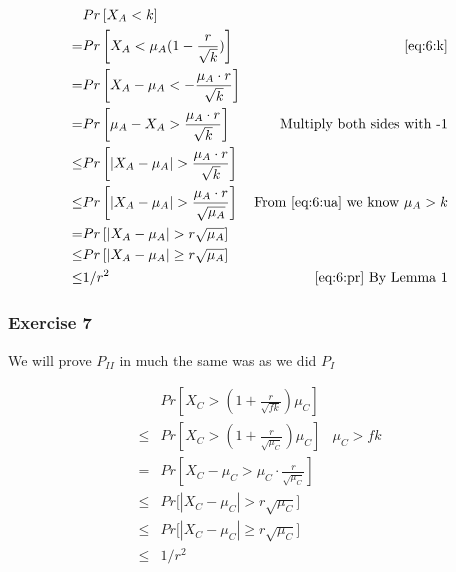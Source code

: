 \begin{align*}
	 & Pr\left[X_A < k\right] & \\
	=& Pr\left[X_A < \mu_A(1-\frac{r}{\sqrt{k}})\right] & \text{ \eqref{eq:6:k}} \\
	=& Pr\left[X_A - \mu_A < -\frac{\mu_A \cdot r}{\sqrt{k}} \right] & \\
	=& Pr\left[\mu_A - X_A > \frac{\mu_A \cdot r}{\sqrt{k}} \right] & \text{Multiply both sides with -1} \\
	\leq & Pr\left[|X_A - \mu_A| > \frac{\mu_A \cdot r}{\sqrt{k}} \right] 
		& \\
	\leq & Pr\left[|X_A - \mu_A| > \frac{\mu_A \cdot r}{\sqrt{\mu_A}} \right]
		& \text{From \eqref{eq:6:ua} we know $\mu_A > k$} \\
	=& Pr\left[|X_A - \mu_A| > r \sqrt{\mu_A} \right]
		&\\
	\leq & Pr\left[|X_A - \mu_A| \geq r \sqrt{\mu_A} \right]
		& \\
	\leq & 1/r^2 & \text{\eqref{eq:6:pr} By Lemma 1}
\end{align*}

\subsubsection{Exercise 7}
We will prove $P_{II}$ in much the same was as we did $P_{I}$

\begin{align*}
	& Pr\left[ X_C > (1+\frac{r}{\sqrt{fk}}) \mu_C \right] & \\
	\leq & Pr\left[ X_C > (1+\frac{r}{\sqrt{\mu_C}}) \mu_C \right]
		& \text{$\mu_C > fk$} \\
		=& Pr\left[ X_C - \mu_C > \mu_C \cdot \frac{r}{\sqrt{\mu_C}} \right]
		& \\
	\leq& Pr\Big[ | X_C - \mu_C | > r \sqrt{\mu_C} \Big]
		& \\
	\leq& Pr\Big[ | X_C - \mu_C | \geq r \sqrt{\mu_C} \Big]
		& \\
	\leq& 1/r^2
\end{align*}

